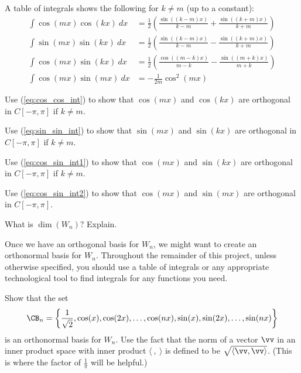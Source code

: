 \begin{pactivity} \label{act:Fourier_Wn} A table of integrals shows the following for $k \neq m$ (up to a constant):
\begin{align}
\int \cos(mx)\cos(kx) \ dx &= \frac{1}{2} \left( \frac{\sin((k-m)x)}{k-m} + \frac{\sin((k+m)x)}{k+m} \right)  \label{eq:cos_cos_int} \\
\int \sin(mx)\sin(kx) \ dx &= \frac{1}{2} \left( \frac{\sin((k-m)x)}{k-m} - \frac{\sin((k+m)x)}{k+m} \right)   \label{eq:sin_sin_int} \\
\int \cos(mx)\sin(kx) \ dx &= \frac{1}{2} \left( \frac{\cos((m-k)x)}{m-k} - \frac{\sin((m+k)x)}{m+k} \right)  \label{eq:cos_sin_int1} \\
\int \cos(mx)\sin(mx) \ dx &= -\frac{1}{2m} \cos^2(mx)  \label{eq:cos_sin_int2}
\end{align}
	\ba
	\item Use (\ref{eq:cos_cos_int}) to show that $\cos(mx)$ and $\cos(kx)$ are orthogonal in $C[-\pi,\pi]$ if $k \neq m$. 


	\item Use (\ref{eq:sin_sin_int}) to show that $\sin(mx)$ and $\sin(kx)$ are orthogonal in $C[-\pi,\pi]$ if $k \neq m$.

	
	\item Use (\ref{eq:cos_sin_int1}) to show that $\cos(mx)$ and $\sin(kx)$ are orthogonal in $C[-\pi,\pi]$ if $k \neq m$.

	
	\item Use (\ref{eq:cos_sin_int2}) to show that $\cos(mx)$ and $\sin(mx)$ are orthogonal in $C[-\pi,\pi]$.

	
	\item What is $\dim(W_n)$? Explain.
	
	\ea
\end{pactivity}

Once we have an orthogonal basis for $W_n$, we might want to create an orthonormal basis for $W_n$. Throughout the remainder of this project, unless otherwise specified, you should use a table of integrals or any appropriate technological tool to find integrals for any functions you need. 

\begin{pactivity} \label{act:Fourier_basis} Show that the set
\[\CB_n = \left\{\frac{1}{\sqrt{2}}, \cos(x), \cos(2x), \ldots, \cos(nx), \sin(x), \sin(2x), \ldots, \sin(nx)\right\}\]
is an orthonormal basis for $W_n$. Use the fact that the norm of a vector $\vv$ in an inner product space with inner product $\langle \ , \ \rangle$ is defined to be $\sqrt{\langle \vv, \vv \rangle}$. (This is where the factor of $\frac{1}{\pi}$ will be helpful.)

\end{pactivity}

